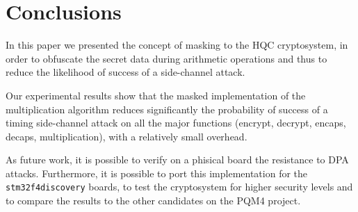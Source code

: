 \section{Conclusions}
In this paper we presented the concept of masking to the HQC cryptosystem, in order to obfuscate the secret data during arithmetic operations and thus to reduce the likelihood of success of a side-channel attack.

Our experimental results show that the masked implementation of the multiplication algorithm reduces significantly the probability of success of a timing side-channel attack on all the major functions (encrypt, decrypt, encaps, decaps, multiplication), 
with a relatively small overhead.

As future work, it is possible to verify on a phisical board the resistance to DPA attacks. Furthermore, it is possible to port this implementation for the \texttt{stm32f4discovery} boards, 
to test the cryptosystem for higher security levels and to compare the results to the other candidates on the PQM4 project.